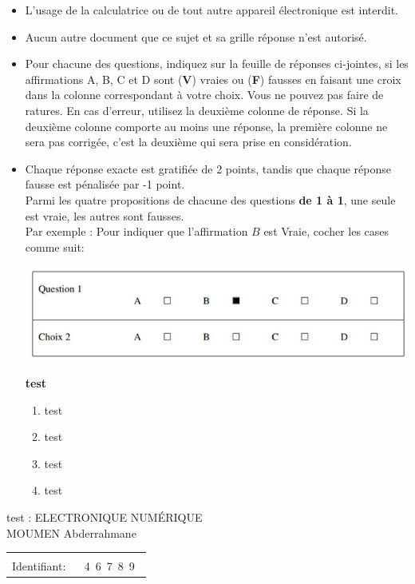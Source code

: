 \documentclass{book}%
\begin{document}
\begin{itemize}%
\item%
L'usage de la calculatrice ou de tout autre appareil électronique est interdit.%
\item%
Aucun autre document que ce sujet et sa grille réponse n'est autorisé.%
\item%
Pour chacune des questions, indiquez sur la feuille de réponses ci-jointes, si les affirmations A, B, C et D sont (\textbf{V}) vraies ou (\textbf{F}) fausses en faisant une croix dans la colonne correspondant à votre choix. Vous ne pouvez pas faire de ratures. En cas d'erreur, utilisez la deuxième colonne de réponse. Si la deuxième colonne comporte au moins une réponse, la première colonne ne sera pas corrigée, c'est la deuxième qui sera prise en considération.%
\item%
Chaque réponse exacte est gratifiée de 2 points, tandis que chaque réponse fausse est pénalisée par -1 point. \\ 	Parmi les quatre propositions de chacune des questions \textbf{de 1 à 1}, une seule est vraie, les autres sont fausses. \\ 	Par exemple : Pour indiquer que l'affirmation $B$ est Vraie, cocher les cases comme suit:  \\ \begin{center}	\includegraphics[scale=0.8]{reponses.png} \end{center}%
\thispagestyle{empty}%
\begin{exercise}%
\textbf{test }%
\begin{enumerate}[label=\textbf{\Alph*. }]%
\item%
test%
\item%
test%
\item%
test%
\item%
test%
\end{enumerate}%
\end{exercise}%
\end{itemize}%
\newpage%
\thispagestyle{empty}%
test : ELECTRONIQUE NUMÉRIQUE $\qquad \qquad \qquad \qquad \qquad \qquad \qquad \qquad$ MOUMEN Abderrahmane%
\begin{flushright}%
\begin{tabular}{|l|}%
\hline%
 \\%
\thispagestyle{empty}%
Identifiant: $\quad$ {\Large 4~6~7~8~9~}%
 \\%
\hline%
\end{tabular}%
\end{flushright}%
\end{document}
